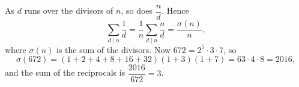 As $d$ runs over the divisors of $n$, so does $\dfrac {n}{d}$. Hence
\[
\sum_{d\mid n}\dfrac{1}{d}=\dfrac{1}{n}\sum_{d\mid n}\dfrac {n}{d}=\dfrac{\sigma(n)}{n},
\]
where $\sigma(n)$ is the sum of the divisors. Now $672=2^5\cdot3\cdot7$, so
\[
\sigma(672)=(1+2+4+8+16+32)(1+3)(1+7)=63\cdot4\cdot8=2016,
\]
and the sum of the reciprocals is $\dfrac{2016}{672}=\boxed{3}$.
